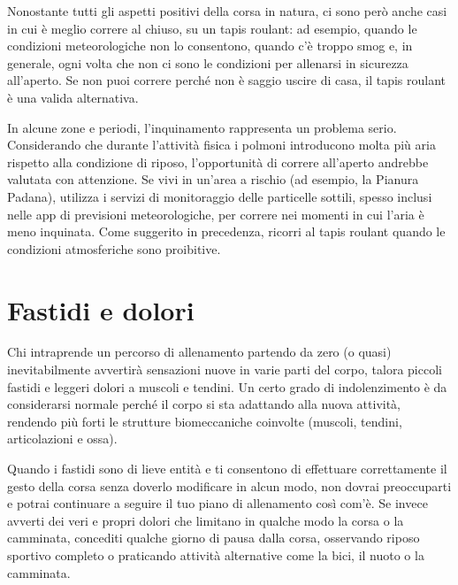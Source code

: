 Nonostante tutti gli aspetti positivi della corsa in natura,
ci sono però anche casi in cui è meglio correre al chiuso, su un tapis roulant:
ad esempio, quando le condizioni meteorologiche non lo consentono,
quando c'è troppo smog
e, in generale, ogni volta che non ci sono le condizioni per allenarsi in sicurezza
all'aperto.
Se non puoi correre perché non è saggio uscire di casa,
il tapis roulant è una valida alternativa.

In alcune zone e periodi, l'inquinamento rappresenta un problema serio.
Considerando che durante l'attività fisica i polmoni introducono molta più aria
rispetto alla condizione di riposo, l'opportunità di correre all'aperto andrebbe
valutata con attenzione.
Se vivi in un'area a rischio (ad esempio, la Pianura Padana), utilizza i servizi
di monitoraggio delle particelle sottili, spesso inclusi nelle app di previsioni
meteorologiche, per correre nei momenti in cui l'aria è meno inquinata.
Come suggerito in precedenza, ricorri al tapis roulant quando le condizioni 
atmosferiche sono proibitive.

\chapter{Fastidi e dolori}

Chi intraprende un percorso di allenamento partendo da zero (o quasi)
inevitabilmente avvertirà sensazioni nuove in varie parti del corpo,
talora piccoli fastidi e leggeri dolori a muscoli e tendini.
Un certo grado di indolenzimento è da considerarsi normale perché
il corpo si sta adattando alla nuova attività, rendendo più forti le strutture
biomeccaniche coinvolte (muscoli, tendini, articolazioni e ossa).

Quando i fastidi sono di lieve entità e ti consentono di effettuare
correttamente il gesto della corsa senza doverlo modificare in alcun modo,
non dovrai preoccuparti e potrai continuare a seguire il tuo piano
di allenamento così com'è.
Se invece avverti dei veri e propri dolori che limitano in qualche modo
la corsa o la camminata,
concediti qualche giorno di pausa dalla corsa,
osservando riposo sportivo completo o
praticando attività alternative come la bici, il nuoto o la camminata.

